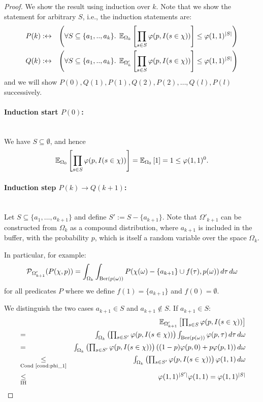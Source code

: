 \begin{proof}
We show the result using induction over $k$. Note that we show the statement for arbitrary $S$,
i.e., the induction statements are:
\begin{eqnarray*}
P(k) & :\leftrightarrow & \left(\forall S \subseteq \{a_1,..,a_k\}. \;
  \operatorname{\mathbb E}_{\Omega_k}\left[ \prod_{s \in S} \varphi(p, I(s \in \chi)) \right]
    \leq \varphi(1,1)^{|S|} \right) \\
Q(k) & :\leftrightarrow & \left(\forall S \subseteq \{a_1,..,a_k\}. \; 
  \operatorname{\mathbb E}_{\Omega'_k}\left[ \prod_{s \in S} \varphi(p, I(s \in \chi)) \right]
    \leq \varphi(1,1)^{|S|} \right)
\end{eqnarray*}
and we will show $P(0),Q(1),P(1),Q(2),P(2),\ldots,Q(l),P(l)$ successively.
\paragraph{Induction start $P(0)$:} \phantom{.}\\
We have $S \subseteq \emptyset$, and hence
\[
\operatorname{\mathbb E}_{\Omega_0}\left[ \prod_{s \in S} \varphi(p, I(s \in \chi)) \right] =
\operatorname{\mathbb E}_{\Omega_0}\left[1\right] = 1 \leq \varphi(1,1)^0 \textrm{.}
\]
\paragraph{Induction step $P(k) \rightarrow Q(k+1)$:} \phantom{.}\\
Let $S \subseteq \{ a_1, \ldots, a_{k+1} \}$ and define $S' := S - \{ a_{k+1} \}$.
Note that $\Omega'_{k+1}$ can be constructed from $\Omega_k$ as a compound distribution, where
$a_{k+1}$ is included in the buffer, with the probability $p$, which is itself a random variable
over the space $\Omega_k$.

In particular, for example:
\[
\operatorname{\mathcal P}_{\Omega'_{k+1}}( P(\chi, p) ) = \int_{\Omega_k} \int_{\textrm{Ber}(p(\omega))} 
P(\chi(\omega)-\{a_{k+1}\}\cup f(\tau), p(\omega)) \, d \tau \, d \omega
\]
for all predicates $P$ where we define $f(1) = \{a_{k+1}\}$ and $f(0) = \emptyset$.

We distinguish the two cases $a_{k+1} \in S$ and $a_{k+1} \notin S$. If $a_{k+1} \in S$:
\begin{eqnarray*}
  & & \textstyle \operatorname{\mathbb E}_{\Omega'_{k+1}}\left[\prod_{s \in S} \varphi(p, I(s \in \chi)) \right] \\
 & = & \textstyle \int_{\Omega_k} \left(\prod_{s \in S'} \varphi(p, I(s \in \chi))\right)
  \int_{\mathrm{Ber}(p(\omega))} \varphi(p, \tau) \, d \tau \, d \omega \\
  & = & \textstyle \int_{\Omega_k} \left(\prod_{s \in S'} \varphi(p, I(s \in \chi))\right) ((1-p) \varphi(p,0) + 
  p \varphi(p,1)) \, d \omega\\
  & \underset{\textrm{Cond~\ref{cond:phi_1}}}{\leq} & \textstyle \int_{\Omega_k} \left( \prod_{s \in S'} 
  \varphi(p, I(s \in \chi)) \right) \varphi(1,1) \, d \omega \\
  & \underset{\textrm{IH}}{\leq} & \textstyle \varphi(1,1)^{|S'|} \varphi(1,1) = \varphi(1,1)^{|S|}
\end{eqnarray*}


\end{proof}
